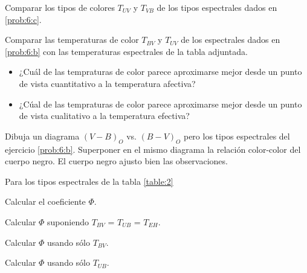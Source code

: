 \documentclass[12pt,a4paper]{practice}
\begin{document}
\begin{problem}
        \begin{problempart}\label{prob:6:d}
            Comparar los tipos de colores $T_{UV}$ y $T_{VB}$ de los tipos espectrales dados en \ref{prob:6:c}.
        \end{problempart}

        \begin{problempart}\label{prob:6:e}
            Comparar las temperaturas de color $T_{BV}$ y $T_{UV}$ de los espectrales dados en \ref{prob:6:b} con las temperaturas espectrales de la tabla adjuntada.

            \begin{itemize}
                \item ¿Cuál de las tempraturas de color parece aproximarse mejor desde un punto de vista cuantitativo a la temperatura afectiva?
                \item ¿Cúal de las tempraturas de color parece aproximarse mejor desde un punto de vista cualitativo a la temperatura efectiva?
            \end{itemize}
        \end{problempart}
    \end{problem}

    \begin{problem}\label{prob:7}
        Dibuja un diagrama $\left(V-B\right)_O$ vs. $\left(B-V\right)_O$ pero los tipos espectrales del ejercicio \ref{prob:6:b}. Superponer en el mismo diagrama la relación color-color del cuerpo negro. El cuerpo negro ajusto bien las observaciones.
    \end{problem}

    \begin{problem}\label{prob:8}
        Para los tipos espectrales de la tabla \ref{table:2}

            \begin{problempart}\label{prob:8:a}
                Calcular el coeficiente $\Phi$.
            \end{problempart}

            \begin{problempart}\label{prob:8:b}
                Calcular $\Phi$ suponiendo $T_{BV}$ = $T_{UB}$ = $T_{EH}$.
            \end{problempart}

            \begin{problempart}\label{prob:8:c}
                Calcular $\Phi$ usando sólo $T_{BV}$.
            \end{problempart}

            \begin{problempart}\label{prob:8:d}
                Calcular $\Phi$ usando sólo $T_{UB}$.
            \end{problempart}
    \end{problem}
\end{document}
